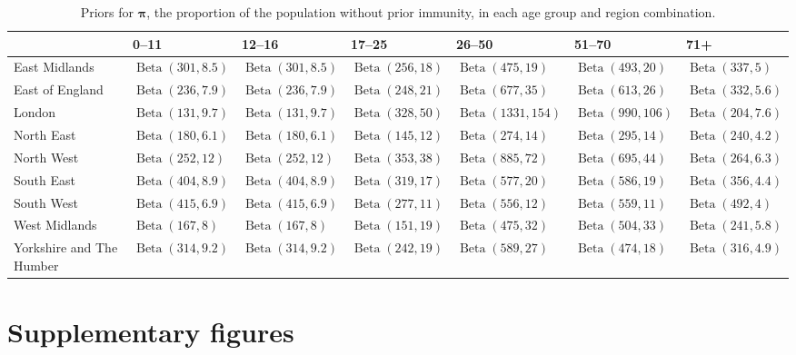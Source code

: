 \documentclass[9pt,twocolumn,twoside]{pnas-new}
\DeclareMathOperator{\BetaDist}{Beta}
\renewcommand{\vec}[1]{\bm{#1}}
\begin{document}
\begin{table}

\centering
\begin{tabular}{l|llllll}
         & 0--11 & 12--16 & 17--25 & 26--50 & 51--70 & 71+ \\
        \hline
        East Midlands & $\BetaDist(301, 8.5)$ & $\BetaDist(301, 8.5)$ & $\BetaDist(256, 18)$ & $\BetaDist(475, 19)$ & $\BetaDist(493, 20)$ & $\BetaDist(337, 5)$ \\
        East of England & $\BetaDist(236, 7.9)$ & $\BetaDist(236, 7.9)$ & $\BetaDist(248, 21)$ & $\BetaDist(677, 35)$ & $\BetaDist(613, 26)$ & $\BetaDist(332, 5.6)$ \\
        London & $\BetaDist(131, 9.7)$& $\BetaDist(131, 9.7)$ & $\BetaDist(328, 50)$ & $\BetaDist(1331, 154)$ & $\BetaDist(990, 106)$ & $\BetaDist(204, 7.6)$ \\
        North East & $\BetaDist(180, 6.1)$& $\BetaDist(180, 6.1)$ & $\BetaDist(145, 12)$ & $\BetaDist(274, 14)$ & $\BetaDist(295, 14)$ & $\BetaDist(240, 4.2)$ \\
        North West & $\BetaDist(252, 12)$ & $\BetaDist(252, 12)$ & $\BetaDist(353, 38)$ & $\BetaDist(885, 72)$ & $\BetaDist(695, 44)$ & $\BetaDist(264, 6.3)$ \\
        South East & $\BetaDist(404, 8.9)$ & $\BetaDist(404, 8.9)$ & $\BetaDist(319, 17)$ & $\BetaDist(577, 20)$ & $\BetaDist(586, 19)$ & $\BetaDist(356, 4.4)$ \\
        South West & $\BetaDist(415, 6.9)$& $\BetaDist(415, 6.9)$ & $\BetaDist(277, 11)$ & $\BetaDist(556, 12)$ & $\BetaDist(559, 11)$ & $\BetaDist(492, 4)$ \\
        West Midlands & $\BetaDist(167, 8)$ & $\BetaDist(167, 8)$ & $\BetaDist(151, 19)$ & $\BetaDist(475, 32)$ & $\BetaDist(504, 33)$ & $\BetaDist(241, 5.8)$ \\
        Yorkshire and The Humber & $\BetaDist(314, 9.2)$ & $\BetaDist(314, 9.2)$ & $\BetaDist(242, 19)$ & $\BetaDist(589, 27)$ & $\BetaDist(474, 18)$ & $\BetaDist(316, 4.9)$ \\
    \end{tabular}
\caption{Priors for $\vec{\pi}$, the proportion of the population without prior immunity, in each age group and region combination.}
\label{SEIR:table:immunity-prior}
\end{table}


\clearpage
\section*{Supplementary figures}
\end{document}
